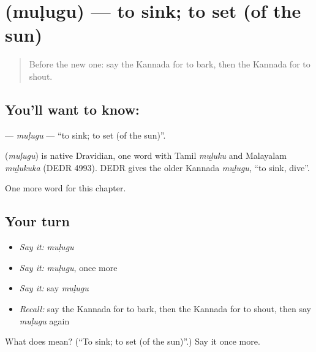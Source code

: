 \section[\texorpdfstring{\kn{ಮುಳುಗು} (muḷugu)}{ಮುಳುಗು (muḷugu)}]{ (muḷugu) — to sink; to set (of the sun)}

\label{lesson:KA-C240-mulugu}



\begin{quote}
Before the new one: say the Kannada for to bark, then the Kannada for to shout.
\end{quote}

\subsection*{You'll want to know: }
\textbf{} — \emph{muḷugu} — \textquotedblleft{}to sink; to set (of the sun)\textquotedblright{}.

\begin{cousinweb}
\textbf{} (\emph{muḷugu}) is native Dravidian, one word with Tamil \emph{muḻuku} and Malayalam \emph{muḻukuka} (DEDR 4993). DEDR gives the older Kannada \emph{muḻugu}, \textquotedblleft{}to sink, dive\textquotedblright{}.
\end{cousinweb}

\begin{grammarlens}[title={What you've built}]
One more word for this chapter.
\end{grammarlens}

\subsection*{Your turn}
\begin{itemize}
\raggedright
  \item \emph{Say it:} \emph{muḷugu}
  \item \emph{Say it:} \emph{muḷugu}, once more
  \item \emph{Say it:} say \emph{muḷugu}
  \item \emph{Recall:} say the Kannada for to bark, then the Kannada for to shout, then say \emph{muḷugu} again
\end{itemize}

\begin{tcolorbox}[breakable,colback=teal!4,colframe=teal!35!black,title={Before you move on}]
What does  mean? (\textquotedblleft{}To sink; to set (of the sun)\textquotedblright{}.) Say it once more.
\end{tcolorbox}
